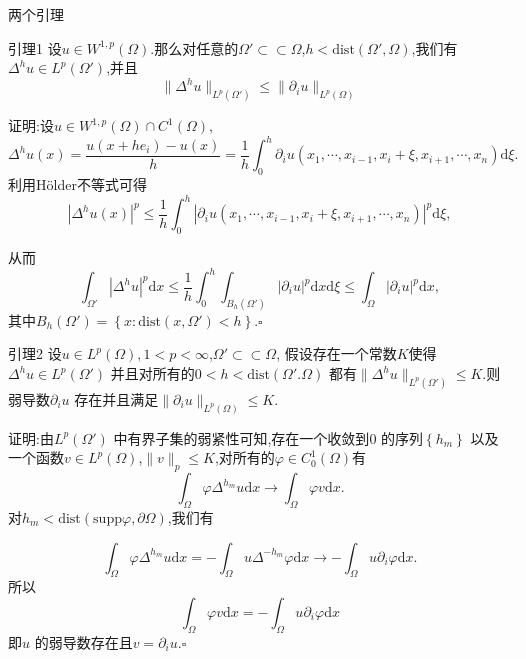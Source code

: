 \begin{frame}[t]{两个引理}
  \begin{alertblock}{引理1}
    设$u\in W^{1,p}(\Omega)$.那么对任意的$\Omega' \subset \subset \Omega$,$h<\mathrm{dist}(\Omega',\Omega)$,我们有$\Delta^{h}u \in L^{p}(\Omega')$,并且
    \[
      \|\Delta^{h}u\|_{L^{p}(\Omega')}\le \|\partial_i u\|_{L^{p}(\Omega)}
    \] 
  \end{alertblock}
  证明:设$u\in W^{1,p}(\Omega)\cap C^{1}(\Omega)$,
  \[
    \Delta^{h}u(x) = \frac{u(x+he_i)-u(x)}{h}=\frac{1}{h}\int_0^{h}\partial_i u\left( x_1,\cdots,x_{i-1},x_i+\xi,x_{i+1},\cdots,x_n \right) \mathrm{d}\xi.
  \] 
  利用H\"{o}lder不等式可得
  \[
    |\Delta^{h}u(x)|^{p}\le \frac{1}{h}\int_{0}^{h}|\partial_i u(x_1,\cdots,x_{i-1},x_i+\xi,x_{i+1},\cdots,x_n)|^{p}\mathrm{d}\xi,
  \] 
\end{frame}
\begin{frame}[t]
  从而
  \[
    \int_{\Omega'}|\Delta^{h}u|^{p}\mathrm{d}x\le \frac{1}{h}\int_0^{h}\int_{B_h(\Omega')}|\partial_i u|^{p}\mathrm{d}x\mathrm{d}\xi\le \int_{\Omega}|\partial_iu|^{p}\mathrm{d}x,
  \]
  其中$B_h(\Omega')=\left\{x:\mathrm{dist}(x,\Omega')<h\right\} $.\hfill $\square$\par


  \begin{alertblock}{引理2}
    设$u\in L^{p}(\Omega),1<p<\infty$,$\Omega'\subset \subset \Omega$, 假设存在一个常数$K$使得 $\Delta^{h}u\in L^{p}(\Omega')$ 并且对所有的$0<h<\mathrm{dist}(\Omega'.\Omega)$ 都有$\|\Delta^{h}u\|_{L^{p}(\Omega')}\le K$.则弱导数$\partial_i u $ 存在并且满足$\|\partial_i u\|_{L^{p}(\Omega)}\le K$.
  \end{alertblock}
  证明:由$L^{p}(\Omega')$ 中有界子集的弱紧性可知,存在一个收敛到$0$ 的序列$\left\{h_m\right\} $ 以及一个函数$v\in L^{p}(\Omega)$,$\|v\|_p\le K$,对所有的$\varphi \in C^{1}_0(\Omega)$有
  \[
  \int_{\Omega}\varphi\Delta^{h_m}u\mathrm{d}x\to \int_{\Omega}\varphi v\mathrm{d}x.
  \]
  对$h_m<\mathrm{dist}(\mathrm{supp}\varphi,\partial \Omega)$,我们有
\end{frame}
\begin{frame}[t]
  \[
  \int_{\Omega}\varphi \Delta^{h_m}u \mathrm{d}x=-\int_{\Omega}u \Delta^{-h_m}\varphi\mathrm{d}x\to - \int_{\Omega}u\partial_i\varphi\mathrm{d}x.
  \]
  所以
  \[
  \int_{\Omega}\varphi v \mathrm{d}x=-\int_{\Omega}u\partial_i\varphi\mathrm{d}x
  \] 
 即$u$ 的弱导数存在且$v=\partial_i u$.\hfill $\square$ \par
\end{frame}
